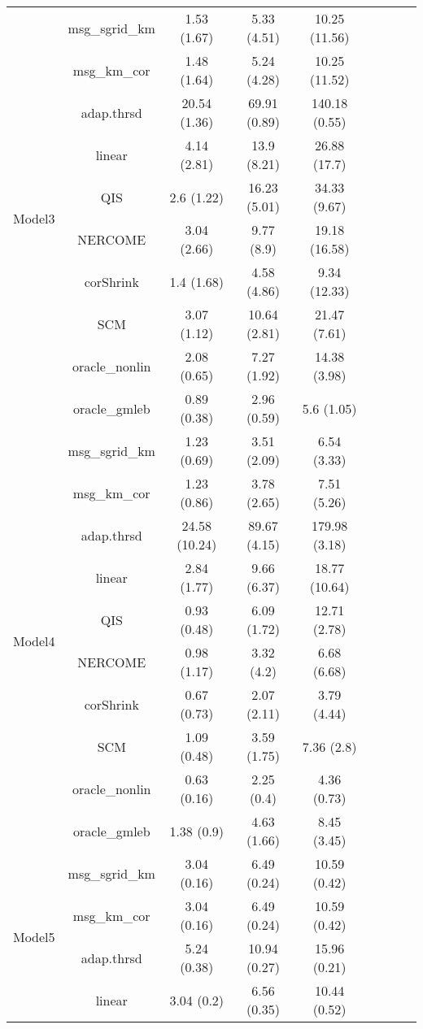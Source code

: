 \documentclass[useAMS,referee,usenatbib]{biom}
\begin{document}
\begin{table}[H]
{\begin{tabular}{ccccccccc}
 \multirow{10}{*}{Model3}   
 & msg\_sgrid\_km & 1.53 (1.67)  & 5.33 (4.51)  & 10.25 (11.56) \\
 & msg\_km\_cor   & 1.48 (1.64)  & 5.24 (4.28)  & 10.25 (11.52) \\
 & adap.thrsd     & 20.54 (1.36) & 69.91 (0.89) & 140.18 (0.55) \\
 & linear         & 4.14 (2.81)  & 13.9 (8.21)  & 26.88 (17.7)  \\
 & QIS            & 2.6 (1.22)   & 16.23 (5.01) & 34.33 (9.67)  \\
 & NERCOME        & 3.04 (2.66)  & 9.77 (8.9)   & 19.18 (16.58) \\
 & corShrink      & 1.4 (1.68)   & 4.58 (4.86)  & 9.34 (12.33)  \\
 & SCM            & 3.07 (1.12)  & 10.64 (2.81) & 21.47 (7.61)  \\
 & oracle\_nonlin & 2.08 (0.65)  & 7.27 (1.92)  & 14.38 (3.98)  \\
 & oracle\_gmleb  & 0.89 (0.38)  & 2.96 (0.59)  & 5.6 (1.05) \\ \midrule
\multirow{10}{*}{Model4}  
 & msg\_sgrid\_km & 1.23 (0.69)   & 3.51 (2.09)  & 6.54 (3.33)   \\
 & msg\_km\_cor   & 1.23 (0.86)   & 3.78 (2.65)  & 7.51 (5.26)   \\
 & adap.thrsd     & 24.58 (10.24) & 89.67 (4.15) & 179.98 (3.18) \\
 & linear         & 2.84 (1.77)   & 9.66 (6.37)  & 18.77 (10.64) \\
 & QIS            & 0.93 (0.48)   & 6.09 (1.72)  & 12.71 (2.78)  \\
 & NERCOME        & 0.98 (1.17)   & 3.32 (4.2)   & 6.68 (6.68)   \\
 & corShrink      & 0.67 (0.73)   & 2.07 (2.11)  & 3.79 (4.44)   \\
 & SCM            & 1.09 (0.48)   & 3.59 (1.75)  & 7.36 (2.8)    \\
 & oracle\_nonlin & 0.63 (0.16)   & 2.25 (0.4)   & 4.36 (0.73)   \\
 & oracle\_gmleb  & 1.38 (0.9)    & 4.63 (1.66)  & 8.45 (3.45)  \\ \midrule
\multirow{10}{*}{Model5}  
 & msg\_sgrid\_km & 3.04 (0.16) & 6.49 (0.24)  & 10.59 (0.42) \\
 & msg\_km\_cor   & 3.04 (0.16) & 6.49 (0.24)  & 10.59 (0.42) \\
 & adap.thrsd     & 5.24 (0.38) & 10.94 (0.27) & 15.96 (0.21) \\
 & linear         & 3.04 (0.2)  & 6.56 (0.35)  & 10.44 (0.52) \\

\end{tabular}}
\end{table}
\end{document}
